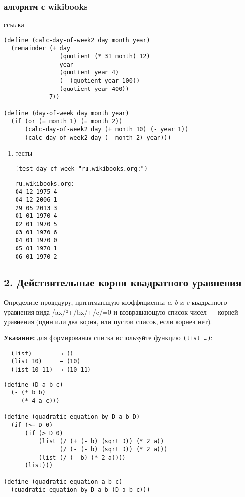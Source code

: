 \documentclass[11pt]{article}
\begin{document}
\subsubsection{алгоритм с wikibooks}
\label{sec:org3cd3901}
\href{https://ru.wikibooks.org/wiki/\%D0\%A0\%D0\%B5\%D0\%B0\%D0\%BB\%D0\%B8\%D0\%B7\%D0\%B0\%D1\%86\%D0\%B8\%D0\%B8\_\%D0\%B0\%D0\%BB\%D0\%B3\%D0\%BE\%D1\%80\%D0\%B8\%D1\%82\%D0\%BC\%D0\%BE\%D0\%B2/\%D0\%92\%D0\%B5\%D1\%87\%D0\%BD\%D1\%8B\%D0\%B9\_\%D0\%BA\%D0\%B0\%D0\%BB\%D0\%B5\%D0\%BD\%D0\%B4\%D0\%B0\%D1\%80\%D1\%8C}{ссылка}
\begin{verbatim}
(define (calc-day-of-week2 day month year)
  (remainder (+ day
                (quotient (* 31 month) 12)
                year
                (quotient year 4)
                (- (quotient year 100))
                (quotient year 400))
             7))

(define (day-of-week day month year)
  (if (or (= month 1) (= month 2))
      (calc-day-of-week2 day (+ month 10) (- year 1))
      (calc-day-of-week2 day (- month 2) year)))
\end{verbatim}
\begin{enumerate}
\item тесты
\label{sec:org86e7df3}
\begin{verbatim}
(test-day-of-week "ru.wikibooks.org:")
\end{verbatim}

\begin{verbatim}
ru.wikibooks.org:
04 12 1975 4
04 12 2006 1
29 05 2013 3
01 01 1970 4
02 01 1970 5
03 01 1970 6
04 01 1970 0
05 01 1970 1
06 01 1970 2

\end{verbatim}
\end{enumerate}

\subsection{2. Действительные корни квадратного уравнения}
\label{действительные-корни-квадратного-уравнения}
Определите процедуру, принимающую коэффициенты \emph{a}, \emph{b} и \emph{c}
квадратного уравнения вида /ax/²+/bx/+/c/=0 и возвращающую список чисел
--- корней уравнения (один или два корня, или пустой список, если корней
нет).

\textbf{Указание:} для формирования списка используйте функцию \texttt{(list …)}:

\begin{verbatim}
  (list)        → ()
  (list 10)     → (10)
  (list 10 11)  → (10 11)
\end{verbatim}
\begin{verbatim}
(define (D a b c)
  (- (* b b)
     (* 4 a c)))

(define (quadratic_equation_by_D a b D)
  (if (>= D 0)
      (if (> D 0)
          (list (/ (+ (- b) (sqrt D)) (* 2 a))
                (/ (- (- b) (sqrt D)) (* 2 a)))
          (list (/ (- b) (* 2 a))))
      (list)))

(define (quadratic_equation a b c)
  (quadratic_equation_by_D a b (D a b c)))
\end{verbatim}
\end{document}
